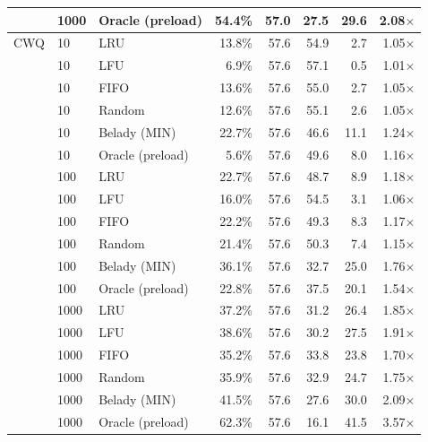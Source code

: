 \begin{table}[htbp]
\begin{tabular}{lllrrrrr}
         & 1000     & Oracle (preload) & 54.4\% & 57.0 & 27.5 & 29.6 & 2.08$\times$ \\
\hline
CWQ      & 10       & LRU      & 13.8\% & 57.6 & 54.9 & 2.7 & 1.05$\times$ \\
         & 10       & LFU      & 6.9\% & 57.6 & 57.1 & 0.5 & 1.01$\times$ \\
         & 10       & FIFO     & 13.6\% & 57.6 & 55.0 & 2.7 & 1.05$\times$ \\
         & 10       & Random   & 12.6\% & 57.6 & 55.1 & 2.6 & 1.05$\times$ \\
         & 10       & Belady (MIN) & 22.7\% & 57.6 & 46.6 & 11.1 & 1.24$\times$ \\
         & 10       & Oracle (preload) & 5.6\% & 57.6 & 49.6 & 8.0 & 1.16$\times$ \\
         & 100      & LRU      & 22.7\% & 57.6 & 48.7 & 8.9 & 1.18$\times$ \\
         & 100      & LFU      & 16.0\% & 57.6 & 54.5 & 3.1 & 1.06$\times$ \\
         & 100      & FIFO     & 22.2\% & 57.6 & 49.3 & 8.3 & 1.17$\times$ \\
         & 100      & Random   & 21.4\% & 57.6 & 50.3 & 7.4 & 1.15$\times$ \\
         & 100      & Belady (MIN) & 36.1\% & 57.6 & 32.7 & 25.0 & 1.76$\times$ \\
         & 100      & Oracle (preload) & 22.8\% & 57.6 & 37.5 & 20.1 & 1.54$\times$ \\
         & 1000     & LRU      & 37.2\% & 57.6 & 31.2 & 26.4 & 1.85$\times$ \\
         & 1000     & LFU      & 38.6\% & 57.6 & 30.2 & 27.5 & 1.91$\times$ \\
         & 1000     & FIFO     & 35.2\% & 57.6 & 33.8 & 23.8 & 1.70$\times$ \\
         & 1000     & Random   & 35.9\% & 57.6 & 32.9 & 24.7 & 1.75$\times$ \\
         & 1000     & Belady (MIN) & 41.5\% & 57.6 & 27.6 & 30.0 & 2.09$\times$ \\
         & 1000     & Oracle (preload) & 62.3\% & 57.6 & 16.1 & 41.5 & 3.57$\times$ \\
\hline
\end{tabular}
\end{table}
